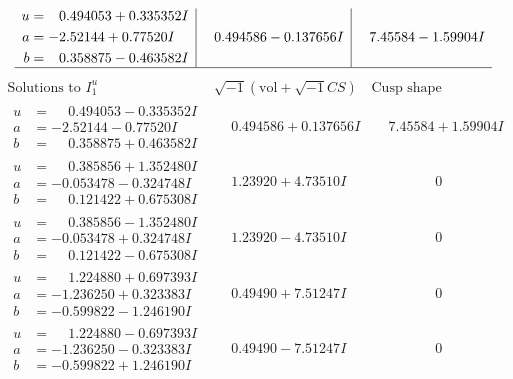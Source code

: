 \documentclass[1p]{elsarticle_modified}
\theoremstyle{definition}
\newcommand{\I}{\sqrt{-1}}
\begin{document}
$$\begin{array}{c|c|c}
\begin{aligned}
u &= \phantom{-}0.494053 + 0.335352 I \\
a &= -2.52144 + 0.77520 I \\
b &= \phantom{-}0.358875 - 0.463582 I\end{aligned}
 & \phantom{-}0.494586 - 0.137656 I & \phantom{-}7.45584 - 1.59904 I\\
 \hline 
 \end{array}$$\newpage$$\begin{array}{c|c|c}  
\text{Solutions to }I^u_{1}& \I (\text{vol} + \sqrt{-1}CS) & \text{Cusp shape}\\
 \hline 
\begin{aligned}
u &= \phantom{-}0.494053 - 0.335352 I \\
a &= -2.52144 - 0.77520 I \\
b &= \phantom{-}0.358875 + 0.463582 I\end{aligned}
 & \phantom{-}0.494586 + 0.137656 I & \phantom{-}7.45584 + 1.59904 I \\ \hline\begin{aligned}
u &= \phantom{-}0.385856 + 1.352480 I \\
a &= -0.053478 - 0.324748 I \\
b &= \phantom{-}0.121422 + 0.675308 I\end{aligned}
 & \phantom{-}1.23920 + 4.73510 I & \phantom{-0.000000 } 0 \\ \hline\begin{aligned}
u &= \phantom{-}0.385856 - 1.352480 I \\
a &= -0.053478 + 0.324748 I \\
b &= \phantom{-}0.121422 - 0.675308 I\end{aligned}
 & \phantom{-}1.23920 - 4.73510 I & \phantom{-0.000000 } 0 \\ \hline\begin{aligned}
u &= \phantom{-}1.224880 + 0.697393 I \\
a &= -1.236250 + 0.323383 I \\
b &= -0.599822 - 1.246190 I\end{aligned}
 & \phantom{-}0.49490 + 7.51247 I & \phantom{-0.000000 } 0 \\ \hline\begin{aligned}
u &= \phantom{-}1.224880 - 0.697393 I \\
a &= -1.236250 - 0.323383 I \\
b &= -0.599822 + 1.246190 I\end{aligned}
 & \phantom{-}0.49490 - 7.51247 I & \phantom{-0.000000 } 0 \\ \hline\begin{aligned}

\end{aligned}
\end{array}$$
\end{document}
